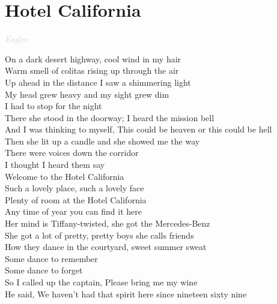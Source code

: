\documentclass[a5paper, 10pt]{book}
\begin{document}
\newpage
\section{Hotel California}\textcolor{lightgray}{\textit{Eagles}}\vspace*{2mm}\\
\begin{minipage}[t]{0.9\textwidth}
On a dark desert highway, cool wind in my hair\\
Warm smell of colitas rising up through the air\\
Up ahead in the distance I saw a shimmering light\\
My head grew heavy and my sight grew dim\\
I had to stop for the night\vspace*{2mm}\\
There she stood in the doorway; I heard the mission bell\\
And I was thinking to myself, This could be heaven or this could be hell\\
Then she lit up a candle and she showed me the way\\
There were voices down the corridor\\
I thought I heard them say\vspace*{2mm}\\
\hspace*{5mm}Welcome to the Hotel California\\
\hspace*{5mm}Such a lovely place, such a lovely face\\
\hspace*{5mm}Plenty of room at the Hotel California\\
\hspace*{5mm}Any time of year you can find it here\vspace*{2mm}\\
Her mind is Tiffany-twisted, she got the Mercedes-Benz\\
She got a lot of pretty, pretty boys she calls friends\\
How they dance in the courtyard, sweet summer sweat\\
Some dance to remember\\
Some dance to forget\vspace*{2mm}\\
So I called up the captain, Please bring me my wine\\
He said, We haven't had that spirit here since nineteen sixty nine\\

\end{minipage}
\end{document}
